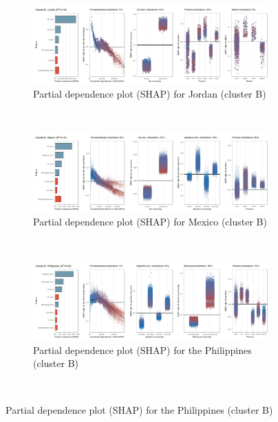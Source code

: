 \begin{figure}[ht!]\ContinuedFloat
    \centering
    \begin{subfigure}[b]{\textwidth}
   \centering
         \caption{Partial dependence plot (SHAP) for Jordan (cluster B)}
         \label{fig:5b_JOR}
         \includegraphics[width=\textwidth]{Figure 5b/Figure_5b_JOR}
         \end{subfigure}
    \\
    \vspace{0.5cm}
    \begin{subfigure}[b]{\textwidth}
  \centering
         \caption{Partial dependence plot (SHAP) for Mexico (cluster B)}
         \label{fig:5b_MEX}
         \includegraphics[width=\textwidth]{Figure 5b/Figure_5b_MEX} \end{subfigure}
    \\
    \vspace{0.5cm}
   \begin{subfigure}[b]{\textwidth}
    \centering
         \caption{Partial dependence plot (SHAP) for the Philippines (cluster B)}
         \label{fig:5b_PHL}
         \includegraphics[width=\textwidth]{Figure 5b/Figure_5b_PHL}         
     \end{subfigure}
    \\
    \vspace{0.5cm}
   

\end{figure}
